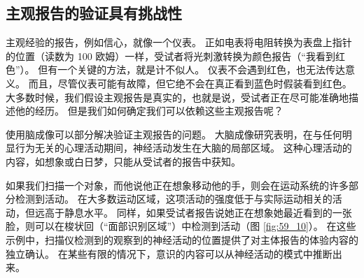 \subsection{主观报告的验证具有挑战性}
主观经验的报告，例如信心，就像一个仪表。 正如电表将电阻转换为表盘上指针的位置（读数为 100 欧姆）一样，受试者将光刺激转换为颜色报告（“我看到红色”）。 但有一个关键的方法，就是计不似人。 仪表不会遇到红色，也无法传达意义。 而且，尽管仪表可能有故障，但它绝不会在真正看到蓝色时假装看到红色。 大多数时候，我们假设主观报告是真实的，也就是说，受试者正在尽可能准确地描述他的经历。 但是我们如何确定我们可以依赖这些主观报告呢？

使用脑成像可以部分解决验证主观报告的问题。 大脑成像研究表明，在与任何明显行为无关的心理活动期间，神经活动发生在大脑的局部区域。 这种心理活动的内容，如想象或白日梦，只能从受试者的报告中获知。

如果我们扫描一个对象，而他说他正在想象移动他的手，则会在运动系统的许多部分检测到活动。 在大多数运动区域，这项活动的强度低于与实际运动相关的活动，但远高于静息水平。 同样，如果受试者报告说她正在想象她最近看到的一张脸，则可以在梭状回（“面部识别区域”）中检测到活动（图 \ref{fig:59_10}）。 在这些示例中，扫描仪检测到的观察到的神经活动的位置提供了对主体报告的体验内容的独立确认。 在某些有限的情况下，意识的内容可以从神经活动的模式中推断出来。


